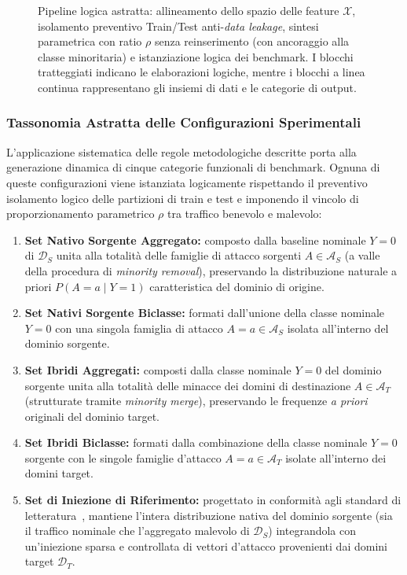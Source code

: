 \begin{figure}[H]
    \caption{Pipeline logica astratta: allineamento dello spazio delle feature $\mathcal{X}$, isolamento preventivo Train/Test anti-\textit{data leakage}, sintesi parametrica con ratio $\rho$ senza reinserimento (con ancoraggio alla classe minoritaria) e istanziazione logica dei benchmark. I blocchi tratteggiati indicano le elaborazioni logiche, mentre i blocchi a linea continua rappresentano gli insiemi di dati e le categorie di output.}
    \label{fig:flusso_benchmark}
\end{figure}

\subsubsection{Tassonomia Astratta delle Configurazioni Sperimentali}
\label{subsubsec:tassonomia_configurazioni}
L'applicazione sistematica delle regole metodologiche descritte porta alla generazione dinamica di cinque categorie funzionali di benchmark. Ognuna di queste configurazioni viene istanziata logicamente rispettando il preventivo isolamento logico delle partizioni di train e test e imponendo il vincolo di proporzionamento parametrico $\rho$ tra traffico benevolo e malevolo:
\begin{enumerate}
    \item \textbf{Set Nativo Sorgente Aggregato:} composto dalla baseline nominale $Y=0$ di $\mathcal{D}_S$ unita alla totalità delle famiglie di attacco sorgenti $A \in \mathcal{A}_S$ (a valle della procedura di \textit{minority removal}), preservando la distribuzione naturale a priori $P(A = a \mid Y = 1)$ caratteristica del dominio di origine.
    \item \textbf{Set Nativi Sorgente Biclasse:} formati dall'unione della classe nominale $Y=0$ con una singola famiglia di attacco $A = a \in \mathcal{A}_S$ isolata all'interno del dominio sorgente.
    \item \textbf{Set Ibridi Aggregati:} composti dalla classe nominale $Y=0$ del dominio sorgente unita alla totalità delle minacce dei domini di destinazione $A \in \mathcal{A}_T$ (strutturate tramite \textit{minority merge}), preservando le frequenze \textit{a priori} originali del dominio target.
    \item \textbf{Set Ibridi Biclasse:} formati dalla combinazione della classe nominale $Y=0$ sorgente con le singole famiglie d'attacco $A = a \in \mathcal{A}_T$ isolate all'interno dei domini target.
    \item \textbf{Set di Iniezione di Riferimento:} progettato in conformità agli standard di letteratura~\cite{azar2023}, mantiene l'intera distribuzione nativa del dominio sorgente (sia il traffico nominale che l'aggregato malevolo di $\mathcal{D}_S$) integrandola con un'iniezione sparsa e controllata di vettori d'attacco provenienti dai domini target $\mathcal{D}_T$.
\end{enumerate}

